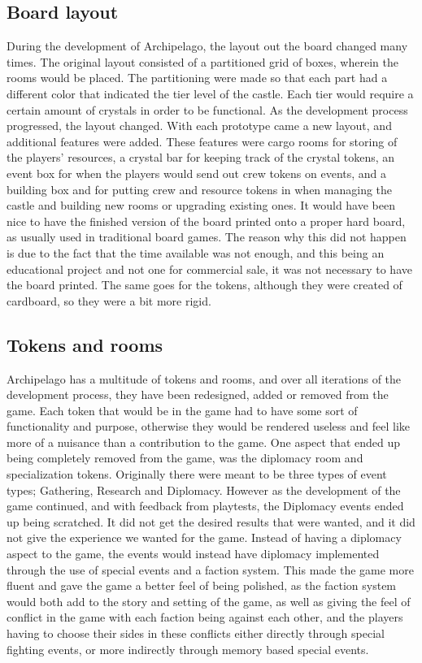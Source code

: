 \subsection{Board layout}
During the development of Archipelago, the layout out the board changed many times. The original layout consisted of a partitioned grid of boxes, wherein the rooms would be placed. The partitioning were made so that each part had a different color that indicated the tier level of the castle. Each tier would require a certain amount of crystals in order to be functional. 
As the development process progressed, the layout changed. With each prototype came a new layout, and additional features were added. These features were cargo rooms for storing of the players' resources, a crystal bar for keeping track of the crystal tokens, an event box for when the players would send out crew tokens on events, and a building box and for putting crew and resource tokens in when managing the castle and building new rooms or upgrading existing ones. 
It would have been nice to have the finished version of the board printed onto a proper hard board, as usually used in traditional board games. The reason why this did not happen is due to the fact that the time available was not enough, and this being an educational project and not one for commercial sale, it was not necessary to have the board printed. The same goes for the tokens, although they were created of cardboard, so they were a bit more rigid.

\subsection{Tokens and rooms}
Archipelago has a multitude of tokens and rooms, and over all iterations of the development process, they have been redesigned, added or removed from the game. Each token that would be in the game had to have some sort of functionality and purpose, otherwise they would be rendered useless and feel like more of a nuisance than a contribution to the game. One aspect that ended up being completely removed from the game, was the diplomacy room and specialization tokens. Originally there were meant to be three types of event types; Gathering, Research and Diplomacy. However as the development of the game continued, and with feedback from playtests, the Diplomacy events ended up being scratched. It did not get the desired results that were wanted, and it did not give the experience we wanted for the game. Instead of having a diplomacy aspect to the game, the events would instead have diplomacy implemented through the use of special events and a faction system. This made the game more fluent and gave the game a better feel of being polished, as the faction system would both add to the story and setting of the game, as well as giving the feel of conflict in the game with each faction being against each other, and the players having to choose their sides in these conflicts either directly through special fighting events, or more indirectly through memory based special events.

